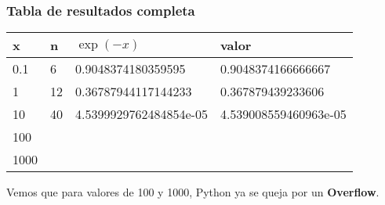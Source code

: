 \begin{frame}
\frametitle{Tabla de resultados completa}
\fontsize{12}{12}\selectfont
\begin{center}
	\begin{tabular}{l | l | l | l}
	x & n & $\exp(-x)$ & valor \\ \hline 
	0.1 & 6 & 0.9048374180359595 & 0.9048374166666667 \\ \hline
	1 & 12 & 0.36787944117144233 & 0.367879439233606 \\ \hline
	10 & 40 & 4.5399929762484854e-05 & 4.539008559460963e-05 \\ \hline
	100 & & & \\ \hline
	1000 & & &
	\end{tabular}
\end{center}
Vemos que para valores de 100 y 1000, Python ya se queja por un \textbf{Overflow}.
\end{frame}
